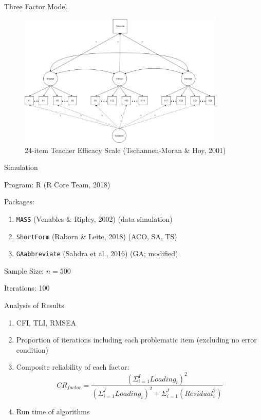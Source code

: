 \documentclass[ignorenonframetext,]{beamer}
\providecommand{\tightlist}{%
  \setlength{\itemsep}{0pt}\setlength{\parskip}{0pt}}
\begin{document}
\begin{frame}{Three Factor Model}
\protect\hypertarget{three-factor-model}{}

\begin{figure}
\centering
\includegraphics[width=3.85417in,height=\textheight]{Factor Diagrams/Three Factor Diagram.png}
\caption{24-item Teacher Efficacy Scale (Tschannen-Moran \& Hoy, 2001)}
\end{figure}

\end{frame}

\begin{frame}[fragile]{Simulation}
\protect\hypertarget{simulation}{}

Program: R (R Core Team, 2018)

Packages:

\begin{enumerate}
\tightlist
\item
  \texttt{MASS} (Venables \& Ripley, 2002) (data simulation)
\item
  \texttt{ShortForm} (Raborn \& Leite, 2018) (ACO, SA, TS)
\item
  \texttt{GAabbreviate} (Sahdra et al., 2016) (GA; modified)
\end{enumerate}

Sample Size: \(n = 500\)

Iterations: 100

\end{frame}

\begin{frame}{Analysis of Results}
\protect\hypertarget{analysis-of-results}{}

\begin{enumerate}
\tightlist
\item
  CFI, TLI, RMSEA
\item
  Proportion of iterations including each problematic item (excluding no
  error condition)
\item
  Composite reliability of each factor:
  \[CR_{factor} = \frac{(\Sigma^I_{i=1}Loading_i)^2}{(\Sigma^I_{i=1}Loading_i)^2 + \Sigma^I_{i=1}(Residual^2_i)} \]
\item
  Run time of algorithms
\end{enumerate}

\end{frame}
\end{document}
